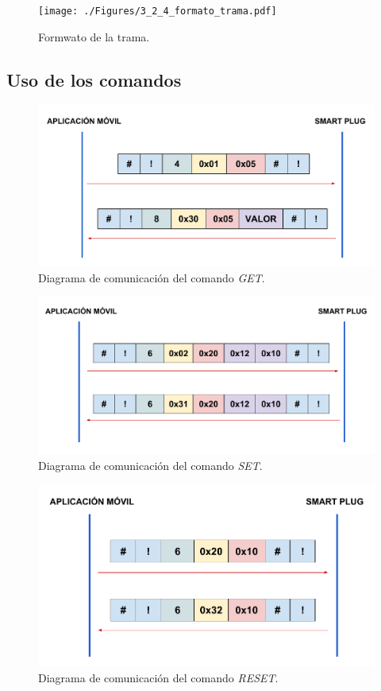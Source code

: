 \begin{figure}[h]
	\centering
	\texttt{[image: ./Figures/3\_2\_4\_formato\_trama.pdf]}
	\caption{Formwato de la trama.}
	\label{fig:formato_trama}
\end{figure}


\subsection{Uso de los comandos}

\begin{figure}[h]
	\centering
	\includegraphics[width=12cm]{./Figures/3_2_5_comunicacion_GET.pdf}
	\caption{Diagrama de comunicación del comando \textit{GET}.}
	\label{fig:comunicacion_get}
\end{figure}


\begin{figure}[h]
	\centering
	\includegraphics[width=12cm]{./Figures/3_2_5_comunicacion_SET.pdf}
	\caption{Diagrama de comunicación del comando \textit{SET}.}
	\label{fig:comunicacion_set}
\end{figure}


\begin{figure}[h]
	\centering
	\includegraphics[width=12cm]{./Figures/3_2_5_comunicacion_RESET.pdf}
	\caption{Diagrama de comunicación del comando \textit{RESET}.}
	\label{fig:comunicacion_reset}
\end{figure}


